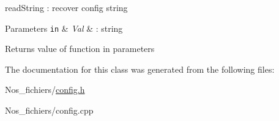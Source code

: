 read\+String \+: recover config string 


\begin{DoxyParams}[1]{Parameters}
\mbox{\tt in}  & {\em Val} & \+: string \\
\hline
\end{DoxyParams}
\begin{DoxyReturn}{Returns}
value of function in parameters 
\end{DoxyReturn}


The documentation for this class was generated from the following files\+:\begin{DoxyCompactItemize}
\item 
Nos\+\_\+fichiers/\hyperlink{config_8h}{config.\+h}\item 
Nos\+\_\+fichiers/config.\+cpp\end{DoxyCompactItemize}
